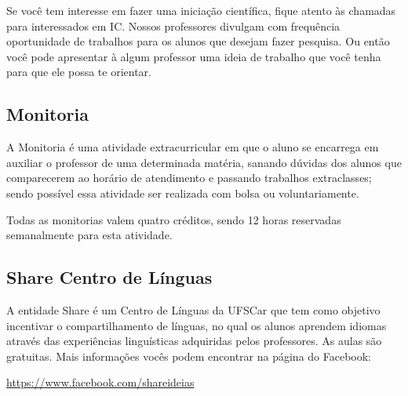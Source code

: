 Se você tem interesse em fazer uma iniciação científica, fique atento às chamadas para interessados em IC. Nossos professores divulgam com frequência oportunidade de trabalhos para os alunos que desejam fazer pesquisa. Ou então você pode apresentar à algum professor uma ideia de trabalho que você tenha para que ele possa te orientar.

\subsection{Monitoria}
A Monitoria é uma atividade extracurricular em que o aluno se encarrega em auxiliar o professor de uma determinada matéria, sanando dúvidas dos alunos que comparecerem ao horário de atendimento e passando trabalhos extraclasses; sendo possível essa atividade ser realizada com bolsa ou voluntariamente.

Todas as monitorias valem quatro créditos, sendo 12 horas reservadas semanalmente para esta atividade.

\subsection{Share Centro de Línguas}
A entidade Share é um Centro de Línguas da UFSCar que tem como objetivo incentivar o compartilhamento de línguas, no qual os alunos aprendem idiomas através das experiências linguísticas adquiridas pelos professores. As aulas são gratuitas.
Mais informações vocês podem encontrar na página do Facebook:

\url{https://www.facebook.com/shareideias}

